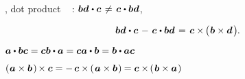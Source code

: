 \vspace{-0.1em}\noindent
{}
,
dot product
~
\::
${\bm{b} \bm{d} \hspace{.1ex} \dotp \bm{c} \hspace{.25ex} \neq \hspace{.25ex} \bm{c} \hspace{.1ex} \dotp \bm{b} \bm{d}}$,

\nopagebreak\vspace{-1.2em}
\begin{equation}
\bm{b} \bm{d} \hspace{.1ex} \dotp \bm{c} \hspace{.25ex} - \hspace{.25ex} \bm{c} \hspace{.1ex} \dotp \bm{b} \bm{d}
\hspace{.25ex} = \hspace{.25ex}
\bm{c} \times \hspace{-0.2ex} \bigl( \hspace{.1ex} \bm{b} \times \bm{d} \hspace{.25ex} \bigr)
\hspace{-0.1ex} .
\end{equation}

\noindent ${
\bm{a} \dotp \bm{b} \bm{c} = \bm{c} \bm{b} \dotp \bm{a} = \bm{c} \bm{a} \dotp \bm{b} = \bm{b} \dotp \bm{a} \bm{c}
}$

\noindent ${
\left(\hspace{.1ex} \bm{a} \times \bm{b} \hspace{.2ex}\right) \hspace{-0.2ex} \times \bm{c}
= - \hspace{.33ex} \bm{c} \times \hspace{-0.15ex} \left(\hspace{.2ex}{\bm{a} \times \bm{b}}\hspace{.15ex}\right) \hspace{-0.1ex}
= \bm{c} \times \hspace{-0.2ex} \left(\hspace{.2ex}{\bm{b} \times \bm{a}}\hspace{.15ex}\right)
}$

\vspace{-0.15em}\noindent
\textcolor{magenta}{
}

